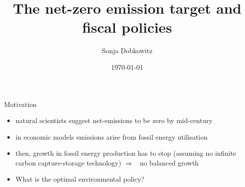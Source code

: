 \documentclass[11pt,aspectratio=169]{beamer}
\author[Sonja Dobkowitz]{\small Sonja Dobkowitz}
\institute[University of Bonn]{University of Bonn}
\title{The net-zero emission target and fiscal policies}
\institute{University of Bonn}
\date{\today}
\newcommand{\ar}{$\Rightarrow$ \ }
\begin{document}
	
	{
		\begin{frame}
		\titlepage
	\end{frame}
}



\begin{frame}{Motivation}

\begin{itemize}[<+-| alert@+>]
\item natural scientists suggest net-emissions to be zero by mid-century \citep{Rogelj2018MitigationDevelopment.}
\vspace{3mm}
\item in economic models emissions arise from fossil energy utilisation
\vspace{3mm}
\item then, growth in fossil energy production has to stop (assuming no infinite carbon capture-storage technology)  \ar no balanced growth 
\vspace{3mm}
\item What is the optimal environmental policy?
\end{itemize}
\end{frame}
\end{document}

